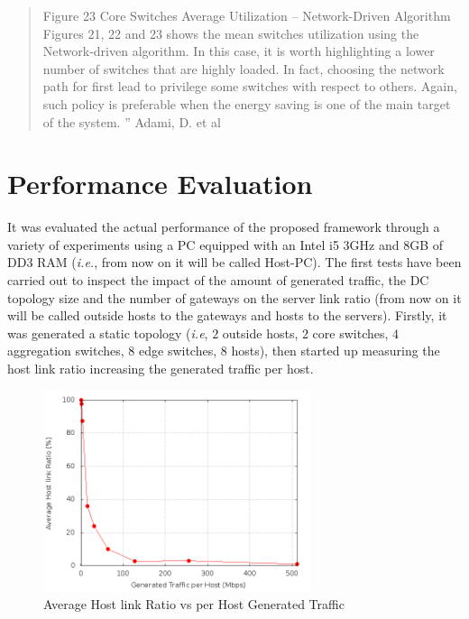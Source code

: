 \documentclass[12pt,english,oneside]{book}
\begin{document}
\begin{quotation}
Figure 23 Core Switches Average Utilization -- Network-Driven Algorithm 
Figures 21, 22 and 23 shows the mean switches utilization 
using the Network-driven algorithm. In this case, it is worth 
highlighting a lower number of switches that are highly loaded. 
In fact, choosing the network path for first lead to privilege some 
switches with respect to others. Again, such policy is preferable 
when the energy saving is one of the main target of the system.
''
\hfill Adami, D. et al \cite{im2013}
\end{quotation}

\section{Performance Evaluation}
\label{sec:perf}
\hspace{0.6cm}

It was evaluated the actual performance of the proposed framework through a variety of experiments using a PC equipped with an Intel i5 3GHz and 8GB of DD3 RAM (\textit{i.e.}, from now on it will be called Host-PC).
The first tests have been carried out to inspect the impact of the amount of generated traffic, the DC topology size and the number of gateways on the server link ratio (from now on it will be called outside hosts to the gateways and hosts to the servers).
Firstly, it was generated a static topology (\textit{i.e}, $2$ outside hosts, $2$ core switches, $4$ aggregation switches, $8$ edge switches, $8$ hosts), then started up measuring the host link ratio increasing the generated traffic per host.

\begin{figure}[h!tbp]
        \centering
        \includegraphics[width=0.7\textwidth]{figures/bw_utilization.png}
        \caption{Average Host link Ratio vs per Host Generated Traffic}
        \label{fig:bw}
\end{figure}
\end{document}
